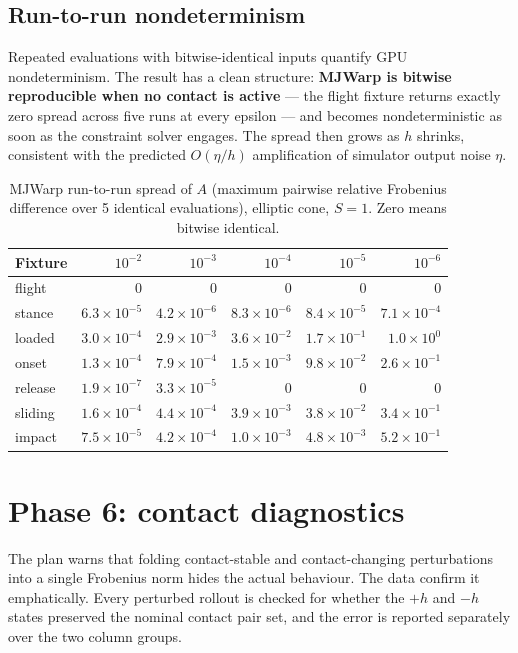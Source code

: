 \documentclass[11pt,a4paper]{article}
\begin{document}
\subsection{Run-to-run nondeterminism}
Repeated evaluations with bitwise-identical inputs quantify GPU nondeterminism. The result
has a clean structure: \textbf{MJWarp is bitwise reproducible when no contact is active} ---
the flight fixture returns exactly zero spread across five runs at every epsilon --- and
becomes nondeterministic as soon as the constraint solver engages. The spread then grows as
$h$ shrinks, consistent with the predicted $O(\eta/h)$ amplification of simulator output
noise $\eta$.

\begin{table}[htbp]
\centering
\footnotesize
\caption{MJWarp run-to-run spread of $A$ (maximum pairwise relative Frobenius difference over 5 identical evaluations), elliptic cone, $S=1$. Zero means bitwise identical.}
\label{tab:noise}
\begin{tabular}{lrrrrr}
\toprule
\textbf{Fixture} & $10^{-2}$ & $10^{-3}$ & $10^{-4}$ & $10^{-5}$ & $10^{-6}$ \\
\midrule
flight & $0$ & $0$ & $0$ & $0$ & $0$ \\
stance & $6.3\times10^{-5}$ & $4.2\times10^{-6}$ & $8.3\times10^{-6}$ & $8.4\times10^{-5}$ & $7.1\times10^{-4}$ \\
loaded & $3.0\times10^{-4}$ & $2.9\times10^{-3}$ & $3.6\times10^{-2}$ & $1.7\times10^{-1}$ & $1.0\times10^{0}$ \\
onset & $1.3\times10^{-4}$ & $7.9\times10^{-4}$ & $1.5\times10^{-3}$ & $9.8\times10^{-2}$ & $2.6\times10^{-1}$ \\
release & $1.9\times10^{-7}$ & $3.3\times10^{-5}$ & $0$ & $0$ & $0$ \\
sliding & $1.6\times10^{-4}$ & $4.4\times10^{-4}$ & $3.9\times10^{-3}$ & $3.8\times10^{-2}$ & $3.4\times10^{-1}$ \\
impact & $7.5\times10^{-5}$ & $4.2\times10^{-4}$ & $1.0\times10^{-3}$ & $4.8\times10^{-3}$ & $5.2\times10^{-1}$ \\
\bottomrule
\end{tabular}
\end{table}

\section{Phase 6: contact diagnostics}

The plan warns that folding contact-stable and contact-changing perturbations into a
single Frobenius norm hides the actual behaviour. The data confirm it emphatically. Every
perturbed rollout is checked for whether the $+h$ and $-h$ states preserved the nominal
contact pair set, and the error is reported separately over the two column groups.
\end{document}
